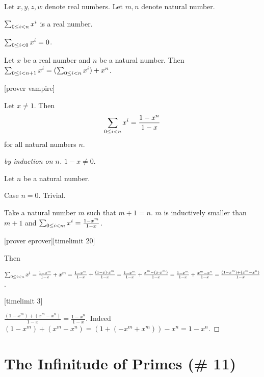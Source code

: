 \documentclass{article}
\begin{document}
\begin{forthel}

Let $x,y,z,w$ denote real numbers. 
Let $m,n$ denote natural number.

\begin{signature}
$\sumgeom{x}{n}$ is a real number.
\end{signature}

\begin{axiom}
$\sumgeom{x}{0} = 0$.
\end{axiom}

\begin{axiom} Let $x$ be a real number and $n$ be
a natural number. Then 
$\sumgeom{x}{n+1} = (\sumgeom{x}{n}) + x^{n}$.
\end{axiom}

[prover vampire]

\begin{theorem} Let $x \neq 1$. Then
$$\sumgeom{x}{n} = \frac{1 - x^{n}}{1 - x}$$
for all natural numbers $n$.
\end{theorem}
\begin{proof}[by induction on $n$]

$1 - x \neq 0$.

Let $n$ be a natural number.

Case $n = 0$. Trivial.

Take a natural number $m$ such that $m + 1 = n$. 
$m$ is inductively smaller than $m+1$ and
$\sumgeom{x}{m} = \frac{1 - x^{m}}{1 - x}$.

[prover eprover][timelimit 20]

Then

$\sumgeom{x}{n} =
\frac{1 - x^{m}}{1 - x} + x^{m} = 
\frac{1 - x^{m}}{1 - x} + \frac{(1-x)\cdot x^{m}}{1 - x} =
\frac{1 - x^{m}}{1 - x} + \frac{x^{m}-(x \cdot x^{m})}{1 - x} =
\frac{1 - x^{m}}{1 - x} + \frac{x^{m} - x^{n}}{1 - x} =
\frac{(1 - x^{m}) + (x^{m} - x^{n})}{1 - x}$.

[timelimit 3]

$\frac{(1 - x^{m}) + (x^{m} - x^{n})}{1 - x} =
\frac{1 - x^{n}}{1 - x}$.
Indeed
$(1 - x^{m}) + (x^{m} - x^{n}) = (1 + (-x^{m} + x^{m})) - x^{n} = 1 - x^{n}$.
\end{proof}
\end{forthel}

\section{The Infinitude of Primes (\# 11)}
\end{document}
